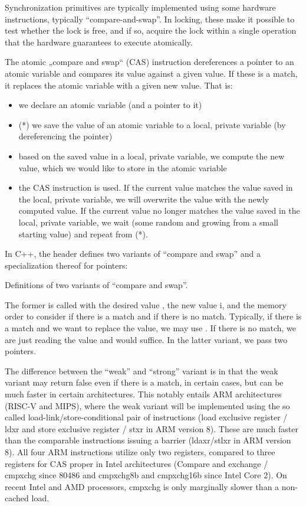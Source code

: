 Synchronization primitives are typically implemented using some hardware instructions, typically ``compare-and-swap''. In locking, these make it possible to test whether the lock is free, and if so, acquire the lock within a single operation that the hardware guarantees to execute atomically.

The atomic „compare and swap“ (CAS) instruction dereferences a pointer to an atomic variable and compares its value against a given value. If these is a match, it replaces the atomic variable with a given new value. That is:
\begin{itemize}
\item we declare an atomic variable (and a pointer to it)
\item (*) we save the value of an atomic variable to a local, private variable (by dereferencing the pointer)
\item based on the saved value in a local, private variable, we compute the new value, which we would like to store in the atomic variable
\item the CAS instruction is used. If the current value matches the value saved in the local, private variable, we will overwrite the value with the newly computed value. If the current value no longer matches the value saved in the local, private variable, we wait (some random and growing from a small starting value) and repeat from (*). 
\end{itemize}

In C++, the  header defines two variants of ``compare and swap'' and a specialization thereof for pointers:

\raggedbottom
\begin{codebox}[]{\href{https://godbolt.org/z/jGb1PxoxY}{\ExternalLink}}
\footnotesize Definitions of two variants of ``compare and swap''.
\tcblower
{}
\end{codebox}

The former is called with the desired value , the new value {i}, and the memory order to consider if there is a match and if there is no match. Typically, if there is a match and we want to replace the value, we may use . If there is no match, we are just reading the value and  would suffice. In the latter variant, we pass two pointers. 

The difference between the ``weak'' and ``strong'' variant is in that the weak variant may return false even if there is a match, in certain cases, but can be much faster in certain architectures. This notably entails ARM architectures (RISC-V and MIPS), where the weak variant will be implemented using the so called load-link/store-conditional pair of instructions (load exclusive register / ldxr and store exclusive register / stxr in ARM version 8).
These are much faster than the comparable instructions issuing a barrier (ldaxr/stlxr in ARM version 8).
All four ARM instructions utilize only two registers, compared to three registers for CAS proper in Intel architectures (Compare and exchange / cmpxchg since 80486 and cmpxchg8b and cmpxchg16b since Intel Core 2). On recent Intel and AMD processors, cmpxchg is only marginally slower than a non-cached load.

